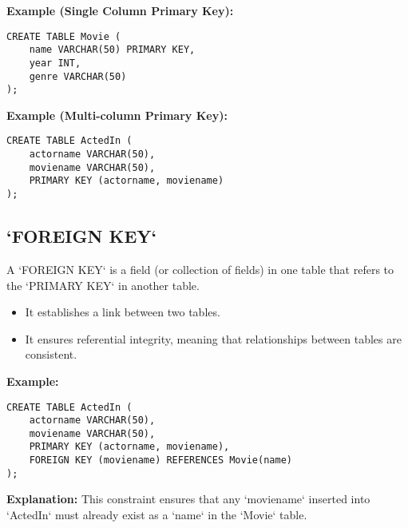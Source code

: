 \documentclass{article}
\begin{document}
\textbf{Example (Single Column Primary Key):} 
\begin{lstlisting}
CREATE TABLE Movie (
    name VARCHAR(50) PRIMARY KEY,
    year INT,
    genre VARCHAR(50)
);
\end{lstlisting}

\textbf{Example (Multi-column Primary Key):} 
\begin{lstlisting}
CREATE TABLE ActedIn (
    actorname VARCHAR(50),
    moviename VARCHAR(50),
    PRIMARY KEY (actorname, moviename)
);
\end{lstlisting}

\subsection*{`FOREIGN KEY`}
A `FOREIGN KEY` is a field (or collection of fields) in one table that refers to the `PRIMARY KEY` in another table.
\begin{itemize}
    \item It establishes a link between two tables.
    \item It ensures referential integrity, meaning that relationships between tables are consistent.
\end{itemize}

\textbf{Example:} 
\begin{lstlisting}
CREATE TABLE ActedIn (
    actorname VARCHAR(50),
    moviename VARCHAR(50),
    PRIMARY KEY (actorname, moviename),
    FOREIGN KEY (moviename) REFERENCES Movie(name)
);
\end{lstlisting}
\textbf{Explanation:} This constraint ensures that any `moviename` inserted into `ActedIn` must already exist as a `name` in the `Movie` table.
\end{document}
